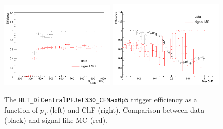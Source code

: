 \begin{figure}[ht]
  \centering
  \includegraphics[width=0.49\textwidth]{figures/trigger/pt_eff_05_DataSIMP.png}\hfill%
  \includegraphics[width=0.49\textwidth]{figures/trigger/chf_eff_05_DataSIMP.png}
  \caption{The \texttt{HLT\_DiCentralPFJet330\_CFMax0p5} trigger efficiency as a function of $p_{T}$ (left) and ChF (right). Comparison between data (black) and signal-like MC (red).}
  \label{fig:efficiencies_simp_data}
\end{figure}

